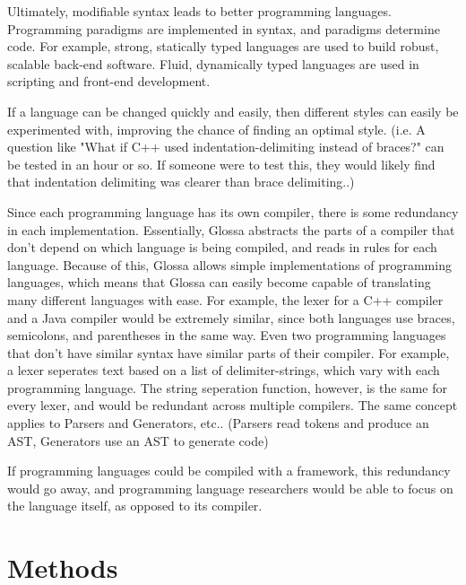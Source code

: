 \documentclass{article}
\begin{document}
Ultimately, modifiable syntax leads to better programming languages.
Programming paradigms are implemented in syntax, and paradigms determine code. 
For example, strong, statically typed languages are used to build robust, scalable back-end software.
Fluid, dynamically typed languages are used in scripting and front-end development.

If a language can be changed quickly and easily, then different styles can easily be experimented with, improving the chance of finding an optimal style.
(i.e. A question like "What if C++ used indentation-delimiting instead of braces?" can be tested in an hour or so. If someone were to test this, they would likely find that indentation delimiting was clearer than brace delimiting..)

Since each programming language has its own compiler, there is some redundancy in each implementation. 
Essentially, Glossa abstracts the parts of a compiler that don't depend on which language is being compiled, and reads in rules for each language.
Because of this, Glossa allows simple implementations of programming languages, which means that Glossa can easily become capable of translating many different languages with ease.
For example, the lexer for a C++ compiler and a Java compiler would be extremely similar, since both languages use braces, semicolons, and parentheses in the same way.
Even two programming languages that don't have similar syntax have similar parts of their compiler. 
For example, a lexer seperates text based on a list of delimiter-strings, which vary with each programming language. The string seperation function, however, is the same for every lexer, and would be redundant across multiple compilers.
The same concept applies to Parsers and Generators, etc.. (Parsers read tokens and produce an AST, Generators use an AST to generate code)

If programming languages could be compiled with a framework, this redundancy would go away, and programming language researchers would be able to focus on the language itself, as opposed to its compiler.

\section{Methods}
\end{document}
